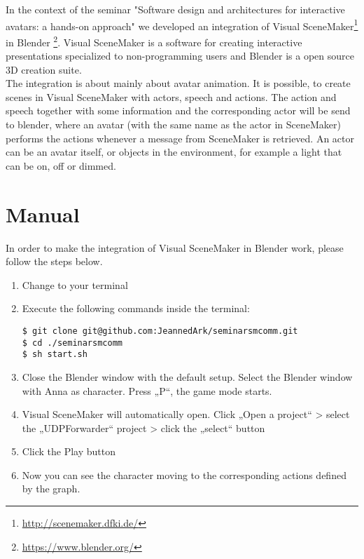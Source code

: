 \documentclass[
10pt, %
a4paper, %
oneside,
headinclude,footinclude, %
BCOR5mm, %
]{scrartcl}
\begin{document}
In the context of the seminar "Software design and architectures for interactive avatars: a hands-on approach" we developed an integration of Visual SceneMaker\footnote{\url{http://scenemaker.dfki.de/}} in Blender \footnote{\url{https://www.blender.org/}}.
Visual SceneMaker is a software for creating interactive presentations specialized to non-programming users and Blender is a open source 3D creation suite.\\
The integration is about mainly about avatar animation. It is possible, to create scenes in Visual SceneMaker with actors, speech and actions. The action and speech together with some information and the corresponding actor will be send to blender, where an avatar (with the same name as the actor in SceneMaker) performs the actions whenever a message from SceneMaker is retrieved. An actor can be an avatar itself, or objects in the environment, for example a light that can be on, off or dimmed.

\section{Manual}
In order to make the integration of Visual SceneMaker in Blender work, please follow the steps below.
\begin{enumerate}[noitemsep] %
\item Change to your terminal
\item Execute the following commands inside the terminal:
\begin{lstlisting}
$ git clone git@github.com:JeannedArk/seminarsmcomm.git
$ cd ./seminarsmcomm
$ sh start.sh
\end{lstlisting}
\item Close the Blender window with the default setup. Select the Blender window with Anna as character. Press „P“, the game mode starts.
\item Visual SceneMaker will automatically open. Click „Open a project“ > select the „UDPForwarder“ project > click the „select“ button
\item Click the Play button
\item Now you can see the character moving to the corresponding actions defined by the graph.
\end{enumerate}
\end{document}

